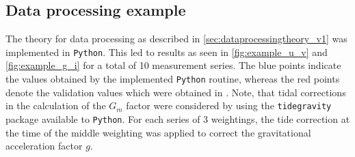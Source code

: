 \documentclass{report}
\numberwithin{tm}{section}
\begin{document}
\subsection{Data processing example}
The theory for data processing as described in \cref{sec:dataprocessingtheory_v1} was implemented in \verb|Python|. This led to results as seen in \cref{fig:example_u_v} and \cref{fig:example_g_i} for a total of 10 measurement series. The blue points indicate the values obtained by the implemented \verb|Python| routine, whereas the red points denote the validation values which were obtained in \cite{Eichenberger_2022}. Note, that tidal corrections in the calculation of the $G_m$ factor were considered by using the \verb|tidegravity| package available to \verb|Python|. For each series of 3 weightings, the tide correction at the time of the middle weighting was applied to correct the gravitational acceleration factor $g$.
\end{document}
